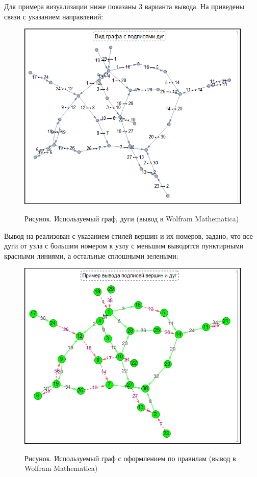 Для примера визуализации ниже показаны 3 варианта вывода. На \textit{} приведены связи с указанием направлений:
\begin{figure}[H]
	\caption{Рисунок. Используемый граф, дуги (вывод в Wolfram Mathematica)}
	\includegraphics[scale=0.68]{images/part7/chapter_integration/integr_alg32.png}
	\label{fig:integr_alg32}
\end{figure}

Вывод на \textit{} реализован с указанием стилей вершин и их номеров, задано, что все дуги от узла с большим номером к узлу с меньшим выводятся пунктирными красными линиями, а остальные сплошными зелеными:

\begin{figure}[H]
	\caption{Рисунок. Используемый граф с оформлением по правилам (вывод в Wolfram Mathematica)}
	\includegraphics[scale=0.88]{images/part7/chapter_integration/integr_alg33.png}
	\label{fig:integr_alg33}
\end{figure}

